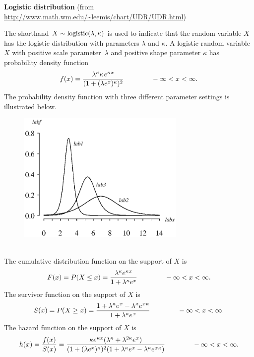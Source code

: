 \documentclass[12pt,fullpage]{article}
\begin{document}
\noindent
{\bf Logistic distribution} (from \color{blue}\url{http://www.math.wm.edu/~leemis/chart/UDR/UDR.html}\color{black})

\noindent
The shorthand $X \sim {\rm logistic}(\lambda, \kappa)$ is used to indicate that the
random variable $X$ has the logistic distribution with parameters $\lambda$ and $\kappa$.
A logistic random variable $X$ with positive scale parameter~$\lambda$ and positive shape parameter $\kappa$ 
has probability density function 
$$
f(x) = \frac{\lambda ^ \kappa \kappa \kern 0.08 em e ^ {\kappa \kern 0.04 em x}}{(1 + (\lambda e ^ x) ^ \kappa) ^ 2} \qquad \qquad -\infty < x < \infty.
$$
The probability density function with three different parameter settings is illustrated below.
\begin{figure}[h!]
\begin{center}
\includegraphics[width=3.2in]{LogisticPlot.ps}
\end{center}
\end{figure}\\
The cumulative distribution function on the support of $X$ is 
$$
F(x) = P(X \le x) = \frac{\lambda^\kappa e ^{\kappa\kern 0.04 em x}}{1+\lambda^\kappa e^x} \qquad \qquad -\infty < x < \infty. 
$$
The survivor function on the support of $X$ is
$$
S(x) = P(X \ge x) =
\frac{1  + \lambda^\kappa e^{\kern 0.04 em x} - \lambda^\kappa e^{\kern 0.04 em x \kern 0.04 em \kappa}}
{1+\lambda^\kappa e^{\kern 0.04 em x}}\qquad \qquad -\infty < x < \infty.
$$
The hazard function on the support of $X$ is
$$
h(x) = \frac{f(x)}{S(x)} =
\frac{\kappa e^{\kern 0.04 em \kappa \kern 0.04em x}(\lambda^\kappa + \lambda^{2\kappa}e^{\kern 0.04 em x})}
{
(1 + (\lambda e ^ x) ^ \kappa) ^ 2
(1  + \lambda^\kappa e^{\kern 0.04 em x} - \lambda^\kappa e^{\kern 0.04 em x \kern 0.04 em \kappa})
}
\qquad \qquad -\infty < x < \infty.
$$
\end{document}
